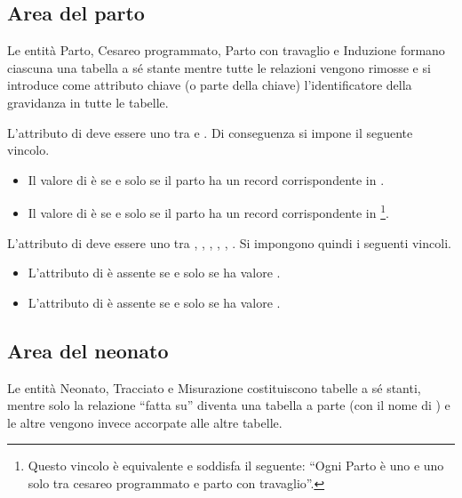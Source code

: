 \subsection{Area del parto}

Le entità Parto, Cesareo programmato, Parto con travaglio e Induzione formano ciascuna una tabella a sé stante mentre tutte le relazioni vengono rimosse e si introduce come attributo chiave (o parte della chiave) l'identificatore della gravidanza in tutte le tabelle.

L'attributo  di  deve essere uno tra  e .
Di conseguenza si impone il seguente vincolo.
\begin{itemize}
\item[\Con{}] Il valore di  è  se e solo se il parto ha un record corrispondente in .
\item[\Con{}] Il valore di  è  se e solo se il parto ha un record corrispondente in \footnote{
    Questo vincolo è equivalente e soddisfa il seguente: \enquote{Ogni Parto è uno e uno solo tra cesareo programmato e parto con travaglio}.
}.
\end{itemize}

L'attributo  di  deve essere uno tra , , , , , .
Si impongono quindi i seguenti vincoli.
\begin{itemize}
\item[\Con{}] L'attributo  di  è assente se e solo se  ha valore .
\item[\Con{}] L'attributo  di  è assente se e solo se  ha valore .
\end{itemize}

\subsection{Area del neonato}

Le entità Neonato, Tracciato e Misurazione costituiscono tabelle a sé stanti, mentre solo la relazione \enquote{fatta su} diventa una tabella a parte (con il nome di ) e le altre vengono invece accorpate alle altre tabelle.

